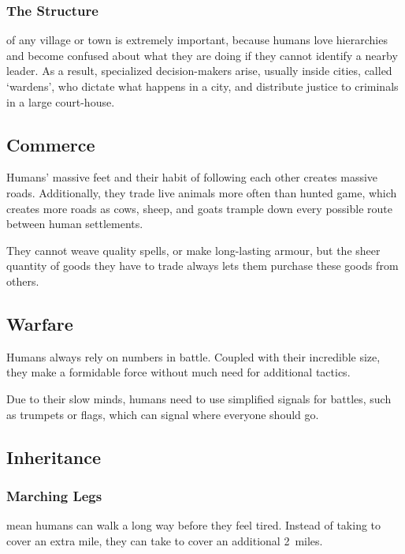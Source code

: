 \begin{multicols}{2}
\subsubsection{The Structure}
of any \gls{village} or town is extremely important, because humans love hierarchies and become confused about what they are doing if they cannot identify a nearby leader.
As a result, specialized decision-makers arise, usually inside cities, called `\glspl{warden}', who dictate what happens in a city, and distribute justice to criminals in a large court-house.

\subsection{Commerce}

Humans' massive feet and their habit of following each other creates massive roads.
Additionally, they trade live animals more often than hunted game, which creates more roads as cows, sheep, and goats trample down every possible route between human settlements.

They cannot weave quality spells, or make long-lasting armour, but the sheer quantity of goods they have to trade always lets them purchase these goods from others.

\subsection{Warfare}
Humans always rely on numbers in battle.
Coupled with their incredible size, they make a formidable force without much need for additional tactics.

Due to their slow minds, humans need to use simplified signals for battles, such as trumpets or flags, which can signal where everyone should go.

\subsection{Inheritance}

\subsubsection[Marching Legs: every \glsentrytext{ep} spent to march adds 2 miles]{Marching Legs}
\label{humanInheritance}
mean humans can walk a long way before they feel tired.
Instead of taking  to cover an extra mile, they can take  to cover an additional 2~miles.


\end{multicols}
